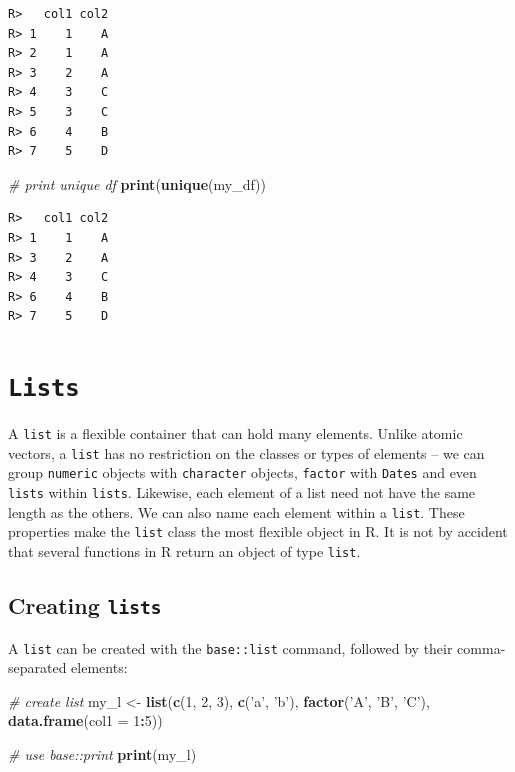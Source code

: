 \documentclass[
  12pt,
]{book}
\newenvironment{Shaded}{\begin{snugshade}}{\end{snugshade}}
\newcommand{\CommentTok}[1]{\textcolor[rgb]{0.37,0.37,0.37}{\textit{#1}}}
\newcommand{\DataTypeTok}[1]{\textcolor[rgb]{0.27,0.27,0.27}{#1}}
\newcommand{\DecValTok}[1]{\textcolor[rgb]{0.06,0.06,0.06}{#1}}
\newcommand{\KeywordTok}[1]{\textcolor[rgb]{0.27,0.27,0.27}{\textbf{#1}}}
\newcommand{\NormalTok}[1]{#1}
\newcommand{\OperatorTok}[1]{\textcolor[rgb]{0.43,0.43,0.43}{\textbf{#1}}}
\newcommand{\StringTok}[1]{\textcolor[rgb]{0.5,0.5,0.5}{#1}}
\begin{document}
\begin{verbatim}
R>   col1 col2
R> 1    1    A
R> 2    1    A
R> 3    2    A
R> 4    3    C
R> 5    3    C
R> 6    4    B
R> 7    5    D
\end{verbatim}

\begin{Shaded}
\begin{Highlighting}[]
\CommentTok{# print unique df}
\KeywordTok{print}\NormalTok{(}\KeywordTok{unique}\NormalTok{(my_df))}
\end{Highlighting}
\end{Shaded}

\begin{verbatim}
R>   col1 col2
R> 1    1    A
R> 3    2    A
R> 4    3    C
R> 6    4    B
R> 7    5    D
\end{verbatim}

\hypertarget{lists}{%
\section{\texorpdfstring{\texttt{Lists}}{Lists}}\label{lists}}

A \texttt{list} is a flexible container that can hold many elements. Unlike atomic vectors, a \texttt{list} has no restriction on the classes or types of elements -- we can group \texttt{numeric} objects with \texttt{character} objects, \texttt{factor} with \texttt{Dates} and even \texttt{lists} within \texttt{lists}. Likewise, each element of a list need not have the same length as the others. We can also name each element within a \texttt{list}. These properties make the \texttt{list} class the most flexible object in R. It is not by accident that several functions in R return an object of type \texttt{list}. 

\hypertarget{creating-lists}{%
\subsection{\texorpdfstring{Creating \texttt{lists}}{Creating lists}}\label{creating-lists}}

A \texttt{list} can be created with the \texttt{base::list} command, followed by their comma-separated elements: 

\begin{Shaded}
\begin{Highlighting}[]
\CommentTok{# create list}
\NormalTok{my_l <-}\StringTok{ }\KeywordTok{list}\NormalTok{(}\KeywordTok{c}\NormalTok{(}\DecValTok{1}\NormalTok{, }\DecValTok{2}\NormalTok{, }\DecValTok{3}\NormalTok{),}
             \KeywordTok{c}\NormalTok{(}\StringTok{'a'}\NormalTok{, }\StringTok{'b'}\NormalTok{),}
             \KeywordTok{factor}\NormalTok{(}\StringTok{'A'}\NormalTok{, }\StringTok{'B'}\NormalTok{, }\StringTok{'C'}\NormalTok{),}
             \KeywordTok{data.frame}\NormalTok{(}\DataTypeTok{col1 =} \DecValTok{1}\OperatorTok{:}\DecValTok{5}\NormalTok{))}

\CommentTok{# use base::print}
\KeywordTok{print}\NormalTok{(my_l)}
\end{Highlighting}
\end{Shaded}
\end{document}
